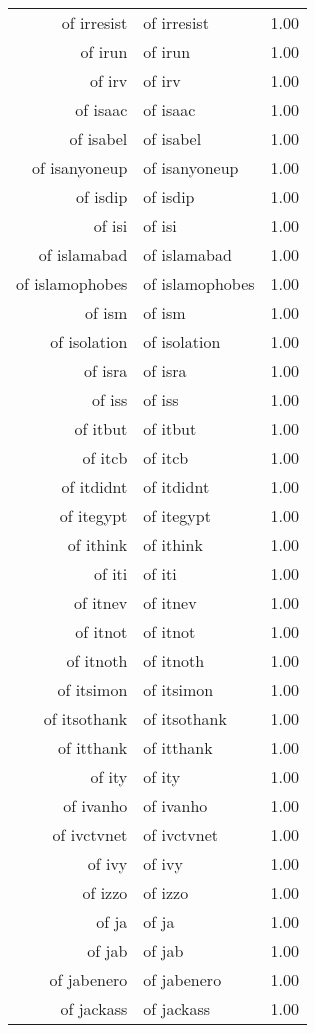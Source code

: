 \begin{table}[ht]
\begin{tabular}{rlr}
  of irresist & of irresist & 1.00 \\ 
  of irun & of irun & 1.00 \\ 
  of irv & of irv & 1.00 \\ 
  of isaac & of isaac & 1.00 \\ 
  of isabel & of isabel & 1.00 \\ 
  of isanyoneup & of isanyoneup & 1.00 \\ 
  of isdip & of isdip & 1.00 \\ 
  of isi & of isi & 1.00 \\ 
  of islamabad & of islamabad & 1.00 \\ 
  of islamophobes & of islamophobes & 1.00 \\ 
  of ism & of ism & 1.00 \\ 
  of isolation & of isolation & 1.00 \\ 
  of isra & of isra & 1.00 \\ 
  of iss & of iss & 1.00 \\ 
  of itbut & of itbut & 1.00 \\ 
  of itcb & of itcb & 1.00 \\ 
  of itdidnt & of itdidnt & 1.00 \\ 
  of itegypt & of itegypt & 1.00 \\ 
  of ithink & of ithink & 1.00 \\ 
  of iti & of iti & 1.00 \\ 
  of itnev & of itnev & 1.00 \\ 
  of itnot & of itnot & 1.00 \\ 
  of itnoth & of itnoth & 1.00 \\ 
  of itsimon & of itsimon & 1.00 \\ 
  of itsothank & of itsothank & 1.00 \\ 
  of itthank & of itthank & 1.00 \\ 
  of ity & of ity & 1.00 \\ 
  of ivanho & of ivanho & 1.00 \\ 
  of ivctvnet & of ivctvnet & 1.00 \\ 
  of ivy & of ivy & 1.00 \\ 
  of izzo & of izzo & 1.00 \\ 
  of ja & of ja & 1.00 \\ 
  of jab & of jab & 1.00 \\ 
  of jabenero & of jabenero & 1.00 \\ 
  of jackass & of jackass & 1.00 \\ 

\end{tabular}
\end{table}
